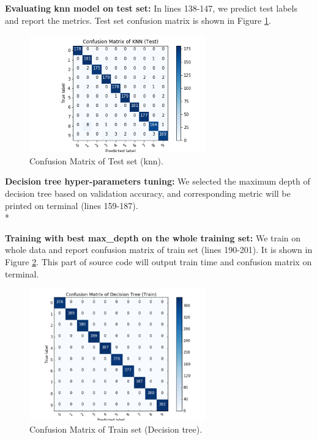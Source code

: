 \documentclass[12pt]{article}
\begin{document}
\textbf{Evaluating knn model on test set:} In lines 138-147, we predict test labels and report the metrics. Test set confusion matrix is shown in Figure \ref{fig:knntest}.
\begin{figure}[h] 
	\begin{center}
		\includegraphics[width=3in]{knntest.png}
		\caption{Confusion Matrix of Test set (knn).}
		\label{fig:knntest}
	\end{center}
\end{figure} 
\newpage
\textbf{Decision tree hyper-parameters tuning:} We selected the maximum depth of decision tree based on validation accuracy, and corresponding metric will be printed on terminal (lines 159-187).\\*

\textbf{Training with best max\_depth on the whole training set:} We train on whole data and report confusion matrix of train set (lines 190-201). It is shown in Figure \ref{fig:dtreetrain}. This part of source code will output train time and confusion matrix on terminal.
\begin{figure}[h] 
	\begin{center}
		\includegraphics[width=3in]{dtreetrain.png}
		\caption{Confusion Matrix of Train set (Decision tree).}
		\label{fig:dtreetrain}
	\end{center}
\end{figure} 
\end{document}
